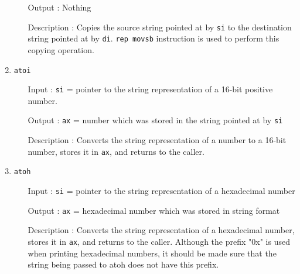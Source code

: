 \begin{enumerate}
\begin{enumerate}[align=parleft, labelsep=2cm, leftmargin=1.06in]
  		  \item[Output]: Nothing
  		  \item[Description]: Copies the source string pointed at by \texttt{si} to the destination string pointed at by \texttt{di}. \texttt{rep movsb} instruction is used to perform this copying operation.
  		\end{enumerate}
  \item \texttt{atoi}
  		\begin{enumerate}[align=parleft, labelsep=2cm, leftmargin=1.06in]
  		  \item[Input]: \texttt{si} = pointer to the string representation of a 16-bit positive number.
  		  \item[Output]: \texttt{ax} = number which was stored in the string pointed at by \texttt{si}
  		  \item[Description]: Converts the string representation of a number to a 16-bit number, stores it in \texttt{ax}, and returns to the caller.
  		\end{enumerate}
  \item \texttt{atoh}
  		\begin{enumerate}[align=parleft, labelsep=2cm, leftmargin=1.06in]
  		  \item[Input]: \texttt{si} = pointer to the string representation of a hexadecimal number
  		  \item[Output]: \texttt{ax} = hexadecimal number which was stored in string format
  		  \item[Description]: Converts the string representation of a hexadecimal number, stores it in \texttt{ax}, and returns to the caller. Although the prefix "0x" is used when printing hexadecimal numbers, it should be made sure that the string being passed to atoh does not have this prefix.
  		\end{enumerate}
\end{enumerate}

